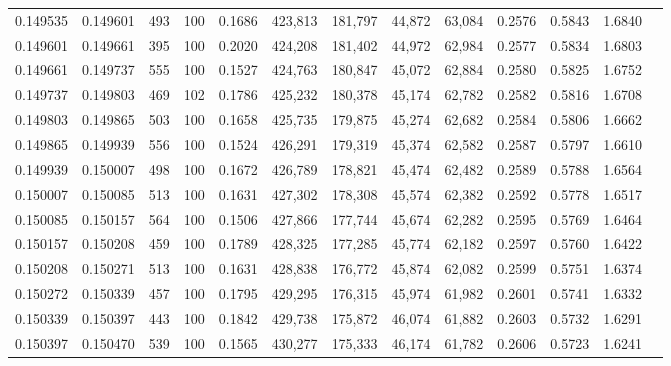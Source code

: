 \begin{tabular}{rrrrrrrrrrrrr}
0.149535 & 0.149601 &   493 & 100 &                                     0.1686 & 423,813 & 181,797 &  44,872 &  63,084 & 0.2576 & 0.5843 & 1.6840 \\
0.149601 & 0.149661 &   395 & 100 &                                     0.2020 & 424,208 & 181,402 &  44,972 &  62,984 & 0.2577 & 0.5834 & 1.6803 \\
0.149661 & 0.149737 &   555 & 100 &                                     0.1527 & 424,763 & 180,847 &  45,072 &  62,884 & 0.2580 & 0.5825 & 1.6752 \\
0.149737 & 0.149803 &   469 & 102 &                                     0.1786 & 425,232 & 180,378 &  45,174 &  62,782 & 0.2582 & 0.5816 & 1.6708 \\
0.149803 & 0.149865 &   503 & 100 &                                     0.1658 & 425,735 & 179,875 &  45,274 &  62,682 & 0.2584 & 0.5806 & 1.6662 \\
0.149865 & 0.149939 &   556 & 100 &                                     0.1524 & 426,291 & 179,319 &  45,374 &  62,582 & 0.2587 & 0.5797 & 1.6610 \\
0.149939 & 0.150007 &   498 & 100 &                                     0.1672 & 426,789 & 178,821 &  45,474 &  62,482 & 0.2589 & 0.5788 & 1.6564 \\
0.150007 & 0.150085 &   513 & 100 &                                     0.1631 & 427,302 & 178,308 &  45,574 &  62,382 & 0.2592 & 0.5778 & 1.6517 \\
0.150085 & 0.150157 &   564 & 100 &                                     0.1506 & 427,866 & 177,744 &  45,674 &  62,282 & 0.2595 & 0.5769 & 1.6464 \\
0.150157 & 0.150208 &   459 & 100 &                                     0.1789 & 428,325 & 177,285 &  45,774 &  62,182 & 0.2597 & 0.5760 & 1.6422 \\
0.150208 & 0.150271 &   513 & 100 &                                     0.1631 & 428,838 & 176,772 &  45,874 &  62,082 & 0.2599 & 0.5751 & 1.6374 \\
0.150272 & 0.150339 &   457 & 100 &                                     0.1795 & 429,295 & 176,315 &  45,974 &  61,982 & 0.2601 & 0.5741 & 1.6332 \\
0.150339 & 0.150397 &   443 & 100 &                                     0.1842 & 429,738 & 175,872 &  46,074 &  61,882 & 0.2603 & 0.5732 & 1.6291 \\
0.150397 & 0.150470 &   539 & 100 &                                     0.1565 & 430,277 & 175,333 &  46,174 &  61,782 & 0.2606 & 0.5723 & 1.6241 \\

\end{tabular}
